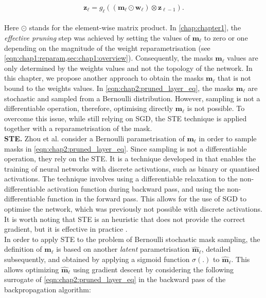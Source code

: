 \begin{equation}
  \label{eqn:chap2:pruned_layer_eq}
  \mathbf{z}_{\ell} = g_\ell( (\bm{m}_\ell \odot \bm{w}_\ell ) \otimes \mathbf{z}_{\ell-1} ).
\end{equation}\\

Here $\odot$ stands for the element-wise matrix product. In
\cref{chap:chapter1}, the \emph{effective pruning} step was achieved by setting
the values of $\bm{m}_\ell$ to zero or one depending on the magnitude of the
weight reparametrisation (see \cref{eqn:chap1:reparam,sec:chap1:overview}).
Consequently, the masks $\bm{m}_\ell$ values are only determined by the weights
values and not the topology of the network. In this chapter, we propose another
approach to obtain the masks $\bm{m}_\ell$ that is not bound to the weights
values. In \cref{eqn:chap2:pruned_layer_eq}, the masks $\bm{m}_\ell$
are stochastic and sampled from a Bernoulli distribution. However, sampling is
not a differentiable operation, therefore, optimising directly
${\bm{m}_\ell}$ is not possible. To overcome this issue, while still
relying on \ac{SGD}, the \acf{STE} technique is applied together with a
reparametrisation of the mask.\\

\noindent\textbf{\acl{STE}.} Zhou et al. \cite{DBLP:conf/nips/ZhouLLY19}
consider a Bernoulli parametrisation of $\bm{m}_\ell$ in order to
sample masks in \cref{eqn:chap2:pruned_layer_eq}. Since sampling is not a
differentiable operation, they rely on the \ac{STE}. It is a technique developed
in \cite{DBLP:journals/corr/BengioLC13} that enables the training of neural
networks with discrete activations, such as binary or quantised activations. The
technique involves using a differentiable relaxation to the non-differentiable
activation function during backward pass, and using the non-differentiable
function in the forward pass. This allows for the use of \ac{SGD} to optimise
the network, which was previously not possible with discrete activations. It is
worth noting that \ac{STE} is an heuristic that does not provide the correct
gradient, but it is effective in practice \cite{DBLP:journals/corr/BengioLC13}.\\

In order to apply \ac{STE} to the problem of Bernoulli stochastic mask
sampling, the definition of $\bm{m}_\ell$ is based on another
  {\it latent} parametrisation $\bm{\hat{m}}_\ell$, detailed
subsequently, and obtained by applying a sigmoid function $\sigma(.)$ to
$\bm{\hat{m}}_\ell$. This allows optimizing $\bm{\hat{m}}_\ell$  using gradient
descent by considering the following surrogate of
\cref{eqn:chap2:pruned_layer_eq} in the backward pass of the backpropagation
algorithm:\\

